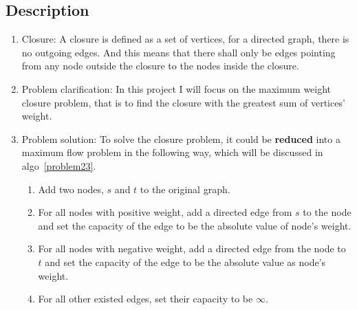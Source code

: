\documentclass{article}
\begin{document}
\subsection*{Description}
\begin{enumerate}
\item Closure: A closure is defined as a set of vertices, for a directed graph, there is no outgoing edges. And this means that there shall only be edges pointing from any node outside the closure to the nodes inside the closure.
\item Problem clarification: In this project I will focus on the maximum weight closure problem, that is to find the closure with the greatest sum of vertices' weight.
\item Problem solution: To solve the closure problem, it could be \textbf{reduced} into a maximum flow problem in the following way, which will be discussed in algo~\ref{problem23}.
\begin{enumerate}
\item Add two nodes, $s$ and $t$ to the original graph.
\item For all nodes with positive weight, add a directed edge from $s$ to the node and set the capacity of the edge to be the absolute value of node's weight.
\item For all nodes with negative weight, add a directed edge from the node to $t$ and set the capacity of the edge to be the absolute value as node's weight.
\item For all other existed edges, set their capacity to be $\infty$.
\end{enumerate}
\end{enumerate}
\newpage
\begin{Algorithm}[Reduction to the max flow\label{problem23}]
	\BlankLine
\end{Algorithm}
\end{document}
